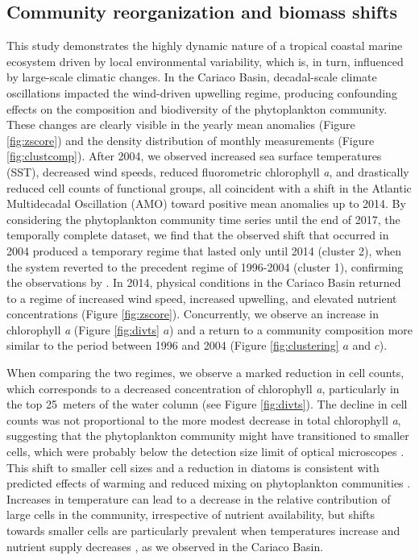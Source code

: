 \documentclass[draft]{agujournal2019}
\begin{document}
\subsection{Community reorganization and biomass shifts}
This study demonstrates the highly dynamic nature of a tropical coastal marine ecosystem driven by local environmental variability, which is, in turn, influenced by large-scale climatic changes. In the Cariaco Basin, decadal-scale climate oscillations impacted the wind-driven upwelling regime, producing confounding effects on the composition and biodiversity of the phytoplankton community.
These changes are clearly visible in the yearly mean anomalies (Figure \ref{fig:zscore}) and the density distribution of monthly measurements (Figure \ref{fig:clustcomp}). After 2004, we observed increased sea surface temperatures (SST), decreased wind speeds, reduced fluorometric chlorophyll \textit{a}, and drastically reduced cell counts of functional groups, all coincident with a shift in the Atlantic Multidecadal Oscillation (AMO) toward positive mean anomalies up to 2014. 
By considering the phytoplankton community time series until the end of 2017, the temporally complete dataset, we find that the observed shift that occurred in 2004 produced a temporary regime that lasted only until 2014 (cluster 2), when the system reverted to the precedent regime of 1996-2004 (cluster 1), confirming the observations by . In 2014, physical conditions in the Cariaco Basin returned to a regime of increased wind speed, increased upwelling, and elevated nutrient concentrations (Figure \ref{fig:zscore}). Concurrently, we observe an increase in chlorophyll \textit{a} (Figure \ref{fig:divts} $a$) and a return to a community composition more similar to the period between 1996 and 2004 (Figure \ref{fig:clustering} $a$ and $c$).

When comparing the two regimes, we observe a marked reduction in cell counts, which corresponds to a decreased concentration of chlorophyll \textit{a}, particularly in the top \qty{25}{meters} of the water column (see Figure \ref{fig:divts}). The decline in cell counts was not proportional to the more modest decrease in total chlorophyll \textit{a}, suggesting that the phytoplankton community might have transitioned to smaller cells, which were probably below the detection size limit of optical microscopes \cite{muller-karger_scientific_2019}. This shift to smaller cell sizes and a reduction in diatoms is consistent with predicted effects of warming and reduced mixing on phytoplankton communities \cite{bopp_response_2005}. Increases in temperature can lead to a decrease in the relative contribution of large cells in the community, irrespective of nutrient availability, but shifts towards smaller cells are particularly prevalent when temperatures increase and nutrient supply decreases \cite{mousing_global_2014}, as we observed in the Cariaco Basin. 
\end{document}
